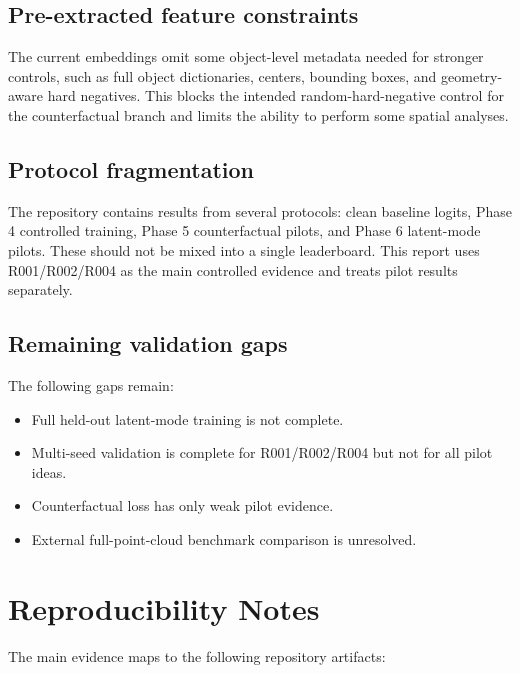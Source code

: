 \documentclass[11pt]{article}
\begin{document}
\subsection{Pre-extracted feature constraints}

The current embeddings omit some object-level metadata needed for stronger controls, such as full object dictionaries, centers, bounding boxes, and geometry-aware hard negatives. This blocks the intended random-hard-negative control for the counterfactual branch and limits the ability to perform some spatial analyses.

\subsection{Protocol fragmentation}

The repository contains results from several protocols: clean baseline logits, Phase 4 controlled training, Phase 5 counterfactual pilots, and Phase 6 latent-mode pilots. These should not be mixed into a single leaderboard. This report uses R001/R002/R004 as the main controlled evidence and treats pilot results separately.

\subsection{Remaining validation gaps}

The following gaps remain:
\begin{itemize}
  \item Full held-out latent-mode training is not complete.
  \item Multi-seed validation is complete for R001/R002/R004 but not for all pilot ideas.
  \item Counterfactual loss has only weak pilot evidence.
  \item External full-point-cloud benchmark comparison is unresolved.
\end{itemize}

\section{Reproducibility Notes}

The main evidence maps to the following repository artifacts:
\end{document}
